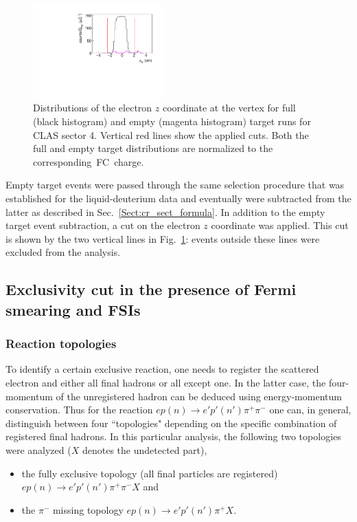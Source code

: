 \documentclass[prc,twocolumn,superscriptaddress,showpacs,amssymb,amsmath,amsfonts,aps,nofootinbib]{revtex4-1}
\begin{document}
\begin{figure}[htp]
\begin{center}
 \includegraphics[width=0.45\textwidth,keepaspectratio]{pictures/event_selection/z_vertex.pdf}
\caption{Distributions of the electron $z$ coordinate at the vertex for full (black histogram) and empty (magenta histogram) target runs for CLAS sector 4. Vertical red lines show the applied cuts. Both the full and empty target distributions are normalized to the corresponding~FC~charge.  }
\label{fig:z_vertex}
\end{center}
\end{figure}


Empty target events were passed through the same selection procedure that was established for the liquid-deuterium data and eventually were subtracted from the latter as described in Sec.\!~\ref{Sect:cr_sect_formula}. In addition to the empty target event subtraction, a cut on the electron $z$ coordinate was applied. This cut is shown by the two vertical lines in Fig.\!~\ref{fig:z_vertex}: events outside these lines were excluded from the analysis. 


\subsection{Exclusivity cut in the presence of Fermi smearing and FSIs}
\label{Sect:excl_cut}

\subsubsection{Reaction topologies}
\label{Sect:topologies}

To identify a certain exclusive reaction, one needs to register the scattered electron and either all final hadrons or all except one. In the latter case, the four-momentum of the unregistered hadron can be deduced using energy-momentum conservation. Thus for the reaction $e p(n) \rightarrow e' p'(n') \pi^{+} \pi^{-} $ one can, in general, distinguish between four ``topologies" depending on the specific combination of registered final hadrons. In this particular analysis, the following two topologies were analyzed ($X$ denotes the undetected part),
\begin{itemize}
\item the fully exclusive topology (all final particles are registered) $e p (n) \rightarrow e' p'(n') \pi^{+} \pi^{-} X$ and
\item the $\pi^{-}$ missing topology $e p(n) \rightarrow e' p'(n') \pi^{+} X$.
\end{itemize} 
\end{document}
